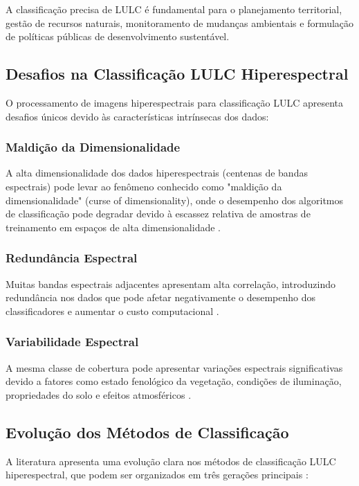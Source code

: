 A classificação precisa de LULC é fundamental para o planejamento territorial, gestão de recursos naturais, monitoramento de mudanças ambientais e formulação de políticas públicas de desenvolvimento sustentável.

\subsection{Desafios na Classificação LULC Hiperespectral}
O processamento de imagens hiperespectrais para classificação LULC apresenta desafios únicos devido às características intrínsecas dos dados:

\subsubsection{Maldição da Dimensionalidade}
A alta dimensionalidade dos dados hiperespectrais (centenas de bandas espectrais) pode levar ao fenômeno conhecido como "maldição da dimensionalidade" (curse of dimensionality), onde o desempenho dos algoritmos de classificação pode degradar devido à escassez relativa de amostras de treinamento em espaços de alta dimensionalidade \cite{Lou2024}.

\subsubsection{Redundância Espectral}
Muitas bandas espectrais adjacentes apresentam alta correlação, introduzindo redundância nos dados que pode afetar negativamente o desempenho dos classificadores e aumentar o custo computacional \cite{Lou2024}.

\subsubsection{Variabilidade Espectral}
A mesma classe de cobertura pode apresentar variações espectrais significativas devido a fatores como estado fenológico da vegetação, condições de iluminação, propriedades do solo e efeitos atmosféricos \cite{Lou2024}.

\subsection{Evolução dos Métodos de Classificação}
A literatura apresenta uma evolução clara nos métodos de classificação LULC hiperespectral, que podem ser organizados em três gerações principais \cite{Lou2024}:

